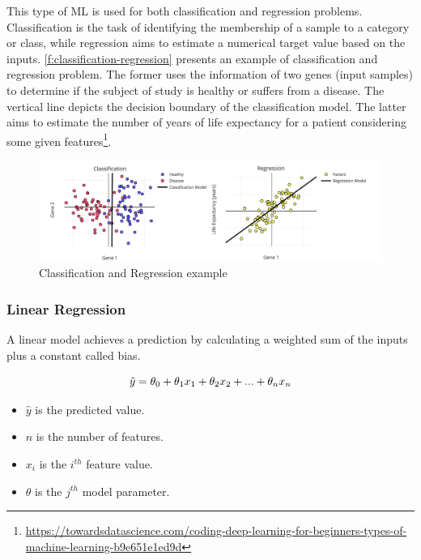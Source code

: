 This type of \ac{ML} is used for both classification and regression problems. Classification is the task of identifying the membership of a sample to a category or class, while regression aims to estimate a numerical target value based on the inputs. \autoref{f:classification-regression} presents an example of classification and regression problem. The former uses the information of two genes (input samples) to determine if the subject of study is healthy or suffers from a disease. The vertical line depicts the decision boundary of the classification model. The latter aims to estimate the number of years of life expectancy for a patient considering some given features\footnote{\url{https://towardsdatascience.com/coding-deep-learning-for-beginners-types-of-machine-learning-b9e651e1ed9d}}. 

\begin{figure}[h]
\centering
\includegraphics[width=\linewidth]{figures/Ch2/Regression-Classification.png}
\caption{Classification and Regression example}
\label{f:classification-regression}
\end{figure}

\subsubsection{Linear Regression}
A linear model achieves a prediction by calculating a weighted sum of the inputs plus a constant called bias.

\begin{equation}
    \hat{y} = \theta_0 + \theta_1 x_1 + \theta_2 x_2 + ...+ \theta_n x_n\\
\end{equation}

\begin{itemize}
    \item \begin{math}\hat{y}\end{math} is the predicted value.
    \item \begin{math}n\end{math} is the number of features.
    \item \begin{math}x_i\end{math} is the \begin{math}i^{th}\end{math} feature value.
    \item \begin{math}\theta\end{math} is the \begin{math}j^{th}\end{math} model parameter.
\end{itemize}

